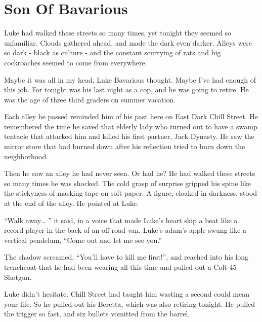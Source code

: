 \chapter{Son Of Bavarious}





Luke had walked these streets so many times, yet tonight they
seemed so unfamiliar. Clouds gathered ahead, and made the dark even
darker. Alleys were so dark - black as culture - and the constant
scurrying of rats and big cockroaches seemed to come from
everywhere.



Maybe it was all in my head, Luke Bavarious thought. Maybe I've had
enough of this job. For tonight was his last night as a cop, and he
was going to retire. He was the age of three third graders on
summer vacation.



Each alley he passed reminded him of his past here on East Dark
Chill Street. He remembered the time he saved that elderly lady who
turned out to have a swamp tentacle that attacked him and killed
his first partner, Jack Dynasty. He saw the mirror store that had
burned down after his reflection tried to burn down the
neighborhood.



Then he saw an alley he had never seen. Or had he? He had walked
these streets so many times he was shocked. The cold grasp of
surprise gripped his spine like the stickyness of masking tape on
soft paper. A figure, cloaked in darkness, stood at the end of the
alley. He pointed at Luke.



``Walk away{\ldots} '' it said, in a voice that made Luke's heart skip a
beat like a record player in the back of an off-road van. Luke's
adam's apple swung like a vertical pendelum, ``Come out and let me
see you.''



The shadow screamed, ``You'll have to kill me first!'', and reached
into his long trenchcoat that he had been wearing all this time and
pulled out a Colt 45 Shotgun.



Luke didn't hesitate. Chill Street had taught him wasting a second
could mean your life. So he pulled out his Beretta, which was also
retiring tonight. He pulled the trigger so fast, and six bullets
vomitted from the barrel.



